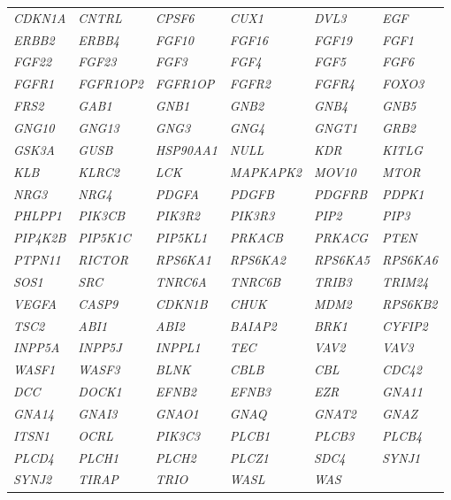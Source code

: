 {\begin{longtable}{>{\em}l>{\em}l>{\em}l>{\em}l>{\em}l>{\em}l}
  \rowcolor{black!10}
  CDKN1A & CNTRL & CPSF6 & CUX1 & DVL3 & EGF \\ 
  \rowcolor{black!5}
  ERBB2 & ERBB4 & FGF10 & FGF16 & FGF19 & FGF1 \\ 
  \rowcolor{black!10}
  FGF22 & FGF23 & FGF3 & FGF4 & FGF5 & FGF6 \\ 
  \rowcolor{black!5}
  FGFR1 & FGFR1OP2 & FGFR1OP & FGFR2 & FGFR4 & FOXO3 \\ 
  \rowcolor{black!10}
  FRS2 & GAB1 & GNB1 & GNB2 & GNB4 & GNB5 \\ 
  \rowcolor{black!5}
  GNG10 & GNG13 & GNG3 & GNG4 & GNGT1 & GRB2 \\ 
  \rowcolor{black!10}
  GSK3A & GUSB & HSP90AA1 & NULL & KDR & KITLG \\ 
  \rowcolor{black!5}
  KLB & KLRC2 & LCK & MAPKAPK2 & MOV10 & MTOR \\ 
  \rowcolor{black!10}
  NRG3 & NRG4 & PDGFA & PDGFB & PDGFRB & PDPK1 \\ 
  \rowcolor{black!5}
  PHLPP1 & PIK3CB & PIK3R2 & PIK3R3 & PIP2 & PIP3 \\ 
  \rowcolor{black!10}
  PIP4K2B & PIP5K1C & PIP5KL1 & PRKACB & PRKACG & PTEN \\ 
  \rowcolor{black!5}
  PTPN11 & RICTOR & RPS6KA1 & RPS6KA2 & RPS6KA5 & RPS6KA6 \\ 
  \rowcolor{black!10}
  SOS1 & SRC & TNRC6A & TNRC6B & TRIB3 & TRIM24 \\ 
  \rowcolor{black!5}
  VEGFA & CASP9 & CDKN1B & CHUK & MDM2 & RPS6KB2 \\ 
  \rowcolor{black!10}
  TSC2 & ABI1 & ABI2 & BAIAP2 & BRK1 & CYFIP2 \\ 
  \rowcolor{black!5}
  INPP5A & INPP5J & INPPL1 & TEC & VAV2 & VAV3 \\ 
  \rowcolor{black!10}
  WASF1 & WASF3 & BLNK & CBLB & CBL & CDC42 \\ 
  \rowcolor{black!5}
  DCC & DOCK1 & EFNB2 & EFNB3 & EZR & GNA11 \\ 
  \rowcolor{black!10}
  GNA14 & GNAI3 & GNAO1 & GNAQ & GNAT2 & GNAZ \\ 
  \rowcolor{black!5}
  ITSN1 & OCRL & PIK3C3 & PLCB1 & PLCB3 & PLCB4 \\ 
  \rowcolor{black!10}
  PLCD4 & PLCH1 & PLCH2 & PLCZ1 & SDC4 & SYNJ1  \\ 
  \rowcolor{black!10}
  SYNJ2 & TIRAP & TRIO & WASL & WAS & \\ 
   \hline
\end{longtable}
} %


